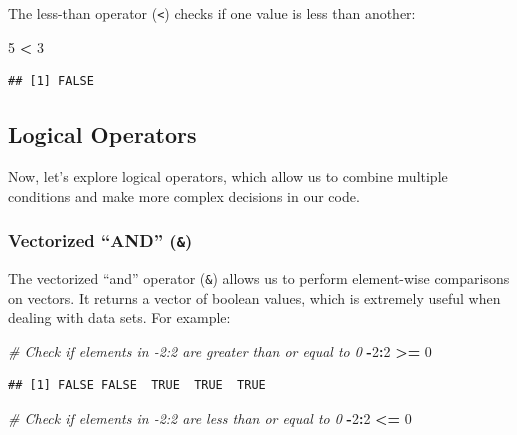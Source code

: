\documentclass[
]{book}
\newenvironment{Shaded}{\begin{snugshade}}{\end{snugshade}}
\newcommand{\CommentTok}[1]{\textcolor[rgb]{0.56,0.35,0.01}{\textit{#1}}}
\newcommand{\DecValTok}[1]{\textcolor[rgb]{0.00,0.00,0.81}{#1}}
\newcommand{\SpecialCharTok}[1]{\textcolor[rgb]{0.81,0.36,0.00}{\textbf{#1}}}
\begin{document}
The less-than operator (\texttt{\textless{}}) checks if one value is less than another:

\begin{Shaded}
\begin{Highlighting}[]
\DecValTok{5} \SpecialCharTok{\textless{}} \DecValTok{3}
\end{Highlighting}
\end{Shaded}

\begin{verbatim}
## [1] FALSE
\end{verbatim}

\hypertarget{logical-operators}{%
\subsection{Logical Operators}\label{logical-operators}}

Now, let's explore logical operators, which allow us to combine multiple conditions and make more complex decisions in our code.

\hypertarget{vectorized-and}{%
\subsubsection{\texorpdfstring{Vectorized ``AND'' (\texttt{\&})}{Vectorized ``AND'' (\&)}}\label{vectorized-and}}

The vectorized ``and'' operator (\texttt{\&}) allows us to perform element-wise comparisons on vectors. It returns a vector of boolean values, which is extremely useful when dealing with data sets. For example:

\begin{Shaded}
\begin{Highlighting}[]
\CommentTok{\# Check if elements in {-}2:2 are greater than or equal to 0}
\SpecialCharTok{{-}}\DecValTok{2}\SpecialCharTok{:}\DecValTok{2} \SpecialCharTok{\textgreater{}=} \DecValTok{0}
\end{Highlighting}
\end{Shaded}

\begin{verbatim}
## [1] FALSE FALSE  TRUE  TRUE  TRUE
\end{verbatim}

\begin{Shaded}
\begin{Highlighting}[]
\CommentTok{\# Check if elements in {-}2:2 are less than or equal to 0}
\SpecialCharTok{{-}}\DecValTok{2}\SpecialCharTok{:}\DecValTok{2} \SpecialCharTok{\textless{}=} \DecValTok{0}
\end{Highlighting}
\end{Shaded}
\end{document}
